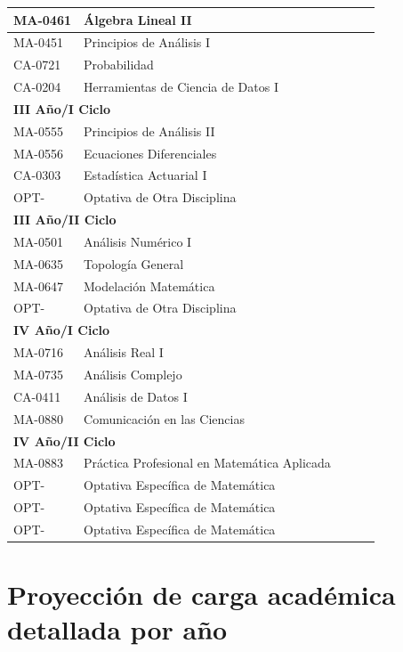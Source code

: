 \begin{longtable}{|p{2cm}|p{7cm}|p{1.6cm}|p{1.6cm}|p{2.8cm}|}
MA-0461 & Álgebra Lineal II &  &  &  \\ \hline
MA-0451 & Principios de Análisis I &  &  &  \\ \hline
CA-0721 & Probabilidad &  &  &  \\ \hline
CA-0204 & Herramientas de Ciencia de Datos I &  &  &  \\ \hline
\multicolumn{5}{|l|}{\cellcolor[HTML]{E6E6E6}\textbf{III Año/I Ciclo}} \\ \hline
MA-0555 & Principios de Análisis II &  &  &  \\ \hline
MA-0556 & Ecuaciones Diferenciales &  &  &  \\ \hline
CA-0303 & Estadística Actuarial I &  &  &  \\ \hline
OPT- & Optativa de Otra Disciplina &  &  &  \\ \hline
\multicolumn{5}{|l|}{\cellcolor[HTML]{E6E6E6}\textbf{III Año/II Ciclo}} \\ \hline
MA-0501 & Análisis Numérico I &  &  &  \\ \hline
MA-0635 & Topología General &  &  &  \\ \hline
MA-0647 & Modelación Matemática &  &  &  \\ \hline
OPT- & Optativa de Otra Disciplina &  &  &  \\ \hline
\multicolumn{5}{|l|}{\cellcolor[HTML]{E6E6E6}\textbf{IV Año/I Ciclo}} \\ \hline
MA-0716 & Análisis Real I &  &  &  \\ \hline
MA-0735 & Análisis Complejo &  &  &  \\ \hline
CA-0411 & Análisis de Datos I &  &  &  \\ \hline
MA-0880 & Comunicación en las Ciencias &  &  &  \\ \hline
\multicolumn{5}{|l|}{\cellcolor[HTML]{E6E6E6}\textbf{IV Año/II Ciclo}} \\ \hline
MA-0883 & Práctica Profesional en Matemática Aplicada &  &  &  \\ \hline
OPT- & Optativa Específica de Matemática &  &  &  \\ \hline
OPT- & Optativa Específica de Matemática &  &  &  \\ \hline
OPT- & Optativa Específica de Matemática &  &  &  \\ \hline
\end{longtable}

\section{Proyección de carga académica detallada por año}
\label{anexo:carga-detalle}

